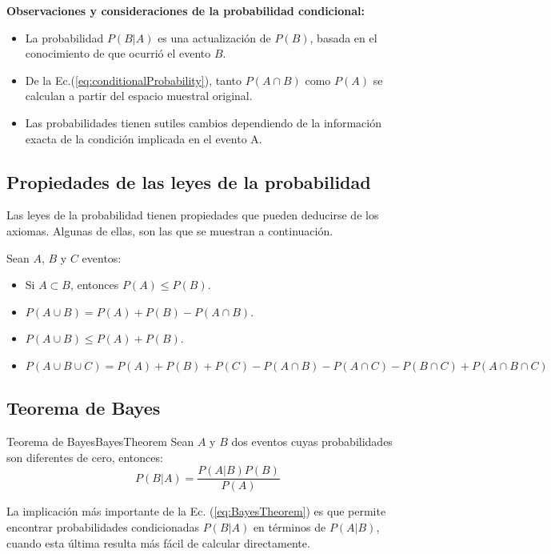 \textbf{Observaciones y consideraciones de la probabilidad condicional:}

\begin{itemize}
\item La probabilidad $P(B|A)$ es una actualización de $P(B)$, basada en el
conocimiento de que ocurrió el evento $B$.

\item De la Ec.(\ref{eq:conditionalProbability}), tanto $P(A \cap B)$ como
$P(A)$ se calculan a partir del espacio muestral original.

\item Las probabilidades tienen sutiles cambios dependiendo de la información
exacta de la condición implicada en el evento A.
\end{itemize}

\subsection{Propiedades de las leyes de la probabilidad}

Las leyes de la probabilidad tienen propiedades que pueden deducirse de los
axiomas. Algunas de ellas, son las que se muestran a continuación.

\begin{tcolorbox}[colback=blue!5!white,colframe=blue!60!black,title=Resumen: Propiedades de las leyes de la probabilidad]
    Sean $A$, $B$ y $C$ eventos:

    \begin{itemize}
        \item Si $A \subset B$, entonces $P(A) \leq P(B)$.
        
        \item $P(A \cup B) = P(A) + P(B) - P(A \cap B)$.

        \item $P(A \cup B) \leq P(A) + P(B)$.

    \item $P(A \cup B \cup C) = P(A) + P(B) + P(C) - P(A \cap B) - P(A \cap C) - P(B
        \cap C) + P(A \cap B \cap C)$
    \end{itemize}
\end{tcolorbox}

\subsection{Teorema de Bayes}

\begin{theorem}{Teorema de Bayes}{BayesTheorem}
Sean $A$ y $B$ dos eventos cuyas probabilidades son diferentes de cero,
entonces:
    \begin{equation}
        P(B|A) = \frac{P(A|B) P(B)}{P(A)}
        \label{eq:BayesTheorem}
    \end{equation}

La implicación más importante de la Ec. (\ref{eq:BayesTheorem}) es que permite
encontrar probabilidades condicionadas $P(B|A)$ en términos de $P(A|B)$, cuando
esta última resulta más fácil de calcular directamente.
\end{theorem}
